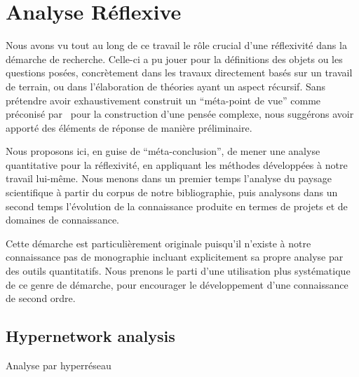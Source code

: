 

\chapter{Analyse Réflexive}




\label{app:reflexivity} %



Nous avons vu tout au long de ce travail le rôle crucial d'une réflexivité dans la démarche de recherche. Celle-ci a pu jouer pour la définitions des objets ou les questions posées, concrètement dans les travaux directement basés sur un travail de terrain, ou dans l'élaboration de théories ayant un aspect récursif. Sans prétendre avoir exhaustivement construit un ``méta-point de vue'' comme préconisé par~\cite{morin1991methode} pour la construction d'une pensée complexe, nous suggérons avoir apporté des éléments de réponse de manière préliminaire.


Nous proposons ici, en guise de ``méta-conclusion'', de mener une analyse quantitative pour la réflexivité, en appliquant les méthodes développées à notre travail lui-même. Nous menons dans un premier temps l'analyse du paysage scientifique à partir du corpus de notre bibliographie, puis analysons dans un second temps l'évolution de la connaissance produite en termes de projets et de domaines de connaissance.


Cette démarche est particulièrement originale puisqu'il n'existe à notre connaissance pas de monographie incluant explicitement sa propre analyse par des outils quantitatifs. Nous prenons le parti d'une utilisation plus systématique de ce genre de démarche, pour encourager le développement d'une connaissance de second ordre.


\section{Hypernetwork analysis}{Analyse par hyperréseau}



